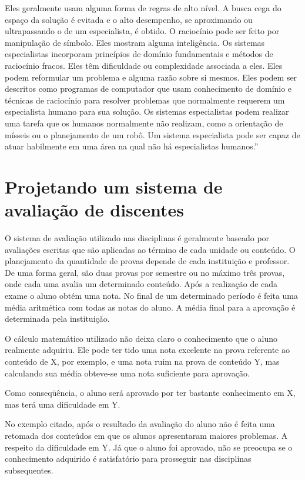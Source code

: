 \documentclass{article}
\begin{document}
Eles geralmente usam alguma forma de regras de alto nível. A
busca cega do espaço da solução é evitada e o alto desempenho,
se aproximando ou ultrapassando o de um especialista, é
obtido. O raciocínio pode ser feito por manipulação de
símbolo. Eles mostram alguma inteligência. Os sistemas
especialistas incorporam princípios de domínio fundamentais
e métodos de raciocínio fracos. Eles têm dificuldade ou
complexidade associada a eles. Eles podem reformular um
problema e alguma razão sobre si mesmos. Eles podem ser
descritos como programas de computador que usam conhecimento de
domínio e técnicas de raciocínio para resolver problemas que
normalmente requerem um especialista humano para sua solução.
Os sistemas especialistas podem realizar uma tarefa que os
humanos normalmente não realizam, como a orientação de
mísseis ou o planejamento de um robô. Um sistema especialista
pode ser capaz de atuar habilmente em uma área na qual não há
especialistas humanos.''\citep{kandel1992fuzzy}

\section{Projetando um sistema de avaliação de discentes}

O sistema de avaliação utilizado nas disciplinas é geralmente
baseado por avaliações escritas que são aplicadas ao término
de cada unidade ou conteúdo. O planejamento da quantidade
de provas depende de cada instituição e professor. De uma
forma geral, são duas provas por semestre ou no máximo três
provas, onde cada uma avalia um determinado conteúdo. Após a
realização de cada exame o aluno obtém uma nota. No final de
um determinado período é feita uma média aritmética com
todas as notas do aluno. A média final para a aprovação é
determinada pela instituição.

O cálculo matemático utilizado não deixa claro o conhecimento
que o aluno realmente adquiriu. Ele pode ter tido uma nota
excelente na prova referente ao conteúdo de X, por
exemplo, e uma nota ruim na prova de conteúdo Y, mas
calculando sua média obteve-se uma nota suficiente para aprovação.

Como conseqüência, o aluno será aprovado por ter bastante
conhecimento em X, mas terá uma dificuldade em Y.

No exemplo citado, após o resultado da avaliação do aluno
não é feita uma retomada dos conteúdos em que os alunos
apresentaram maiores problemas. A respeito
da dificuldade em Y. Já que o aluno foi aprovado, não
se preocupa se o conhecimento adquirido é satisfatório
para prosseguir nas disciplinas subsequentes.
\end{document}
